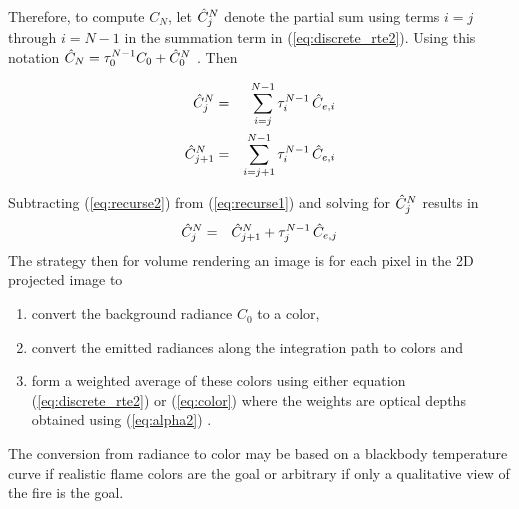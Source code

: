 Therefore, to compute $C_N$, let $\hat{C}_{j}^N$ denote the partial
sum using terms $i=j$ through $i=N-1$ in the summation term in
(\ref{eq:discrete_rte2}).  Using this notation
$\hat{C}_N=\tau_{0}^{N-1}C_0+\hat{C}_{0}^N$ . Then

\begin{eqnarray}
\label{eq:recurse1}
\hat{C}_{j}^N &= &\sum_{i=j}^{N-1}\tau_{i}^{N-1}\,\hat{C}_{e,i}\\
\label{eq:recurse2}
\hat{C}_{j+1}^N     &= &\sum_{i=j+1}^{N-1}  \tau_{i}^{N-1}\,\hat{C}_{e,i}
\end{eqnarray}

Subtracting (\ref{eq:recurse2}) from (\ref{eq:recurse1}) and solving
for $\hat{C}_{j}^N$ results in
\begin{eqnarray}
\label{eq:color}
\hat{C}_{j}^N&=&\hat{C}_{j+1}^N+\tau_{j}^{N-1}\,\hat{C}_{e,j}
\end{eqnarray}
The strategy then for volume rendering an image is for each pixel
in the 2D projected image to
\begin{enumerate}
\item convert the background radiance $C_0$ to a color,

\item convert the emitted radiances along the integration path to
colors and

\item form a weighted average of these colors using either
equation (\ref{eq:discrete_rte2}) or (\ref{eq:color}) where the
weights are optical depths obtained using (\ref{eq:alpha2}) .

\end{enumerate}
The conversion from radiance to color may be based on a blackbody
temperature curve if realistic flame colors are the goal or
arbitrary if only a qualitative view of the fire is the goal.
